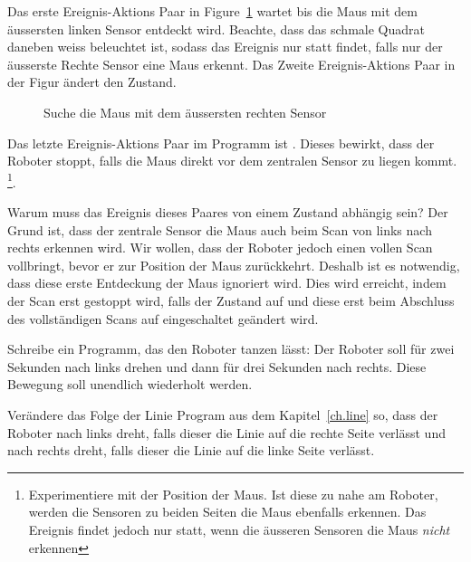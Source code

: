 Das erste Ereignis-Aktions Paar in Figure~\ref{fig.mouse2} wartet bis die Maus mit dem äussersten linken Sensor entdeckt wird. Beachte, dass das schmale Quadrat daneben weiss beleuchtet ist, sodass das Ereignis nur statt findet, falls nur der äusserste Rechte Sensor eine Maus erkennt. Das Zweite Ereignis-Aktions Paar in der Figur ändert den Zustand.

\begin{figure}
\begin{center}
\caption{Suche die Maus mit dem äussersten rechten Sensor}
\label{fig.mouse2}
\end{center}
\end{figure}

Das letzte Ereignis-Aktions Paar im Programm ist . Dieses bewirkt, dass der Roboter stoppt, falls die Maus direkt vor dem zentralen Sensor zu liegen kommt. \footnote{Experimentiere mit der Position der Maus. Ist diese zu nahe am Roboter, werden die Sensoren zu beiden Seiten die Maus ebenfalls erkennen. Das Ereignis findet jedoch nur statt, wenn die äusseren Sensoren die Maus  \emph{nicht} erkennen}.

Warum muss das Ereignis dieses Paares von einem Zustand abhängig sein? Der Grund ist, dass der zentrale Sensor die Maus auch beim Scan von links nach rechts erkennen wird. Wir wollen, dass der Roboter jedoch einen vollen Scan vollbringt, bevor er zur Position der Maus zurückkehrt. Deshalb ist es notwendig, dass diese erste Entdeckung der Maus ignoriert wird. Dies wird erreicht, indem der Scan erst gestoppt wird, falls der Zustand auf  und diese erst beim Abschluss des vollständigen Scans auf eingeschaltet geändert wird.


Schreibe ein Programm, das den Roboter tanzen lässt: Der Roboter soll für zwei Sekunden nach links drehen und dann für drei Sekunden nach rechts. Diese Bewegung soll unendlich wiederholt werden.


Verändere das Folge der Linie Program aus dem Kapitel~\ref{ch.line} so, dass der Roboter nach links dreht, falls dieser die Linie auf die rechte Seite verlässt und nach rechts dreht, falls dieser die Linie auf die linke Seite verlässt.
